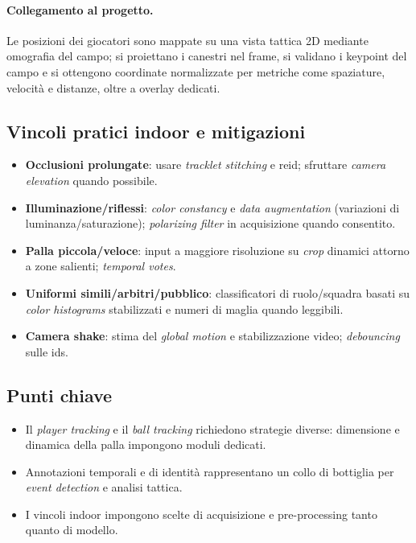\documentclass[12pt,a4paper,openright,twoside]{book}
\begin{document}
\paragraph{Collegamento al progetto.} Le posizioni dei giocatori sono mappate su una vista tattica 2D mediante omografia del campo;
si proiettano i canestri nel frame, si validano i keypoint del campo e si ottengono coordinate normalizzate per metriche come
spaziature, velocità e distanze, oltre a overlay dedicati.


\subsection{Vincoli pratici indoor e mitigazioni}
\begin{itemize}
  \item \textbf{Occlusioni prolungate}: usare \emph{tracklet stitching} e \ac{reid}; sfruttare \emph{camera elevation} quando possibile.
  \item \textbf{Illuminazione/riflessi}: \emph{color constancy} e \emph{data augmentation} (variazioni di luminanza/saturazione); \emph{polarizing filter} in acquisizione quando consentito.
  \item \textbf{Palla piccola/veloce}: input a maggiore risoluzione su \emph{crop} dinamici attorno a zone salienti; \emph{temporal votes}.
  \item \textbf{Uniformi simili/arbitri/pubblico}: classificatori di ruolo/squadra basati su \emph{color histograms} stabilizzati e numeri di maglia quando leggibili.
  \item \textbf{Camera shake}: stima del \emph{global motion} e stabilizzazione video; \emph{debouncing} sulle \acp{id}.
\end{itemize}


\subsection*{Punti chiave}
\begin{itemize}
  \item Il \emph{player tracking} e il \emph{ball tracking} richiedono strategie diverse: dimensione e dinamica della palla impongono moduli dedicati.
  \item Annotazioni temporali e di identità rappresentano un collo di bottiglia per \emph{event detection} e analisi tattica.
  \item I vincoli indoor impongono scelte di acquisizione e pre-processing tanto quanto di modello.
\end{itemize}
\end{document}

